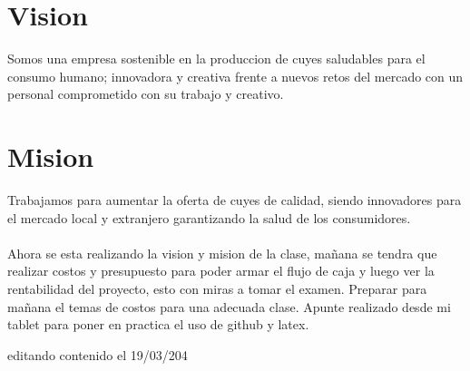 \documentclass[11pt]{article}
\begin{document}
\section{Vision}
Somos una empresa sostenible en la produccion de cuyes saludables para el consumo humano; innovadora y creativa frente a nuevos retos del mercado con un personal comprometido con su trabajo y creativo.
\section{Mision}
Trabajamos para aumentar la oferta de cuyes de calidad, siendo innovadores para el mercado local y extranjero garantizando la salud de los consumidores.\\
\\
Ahora se esta realizando la vision y mision de la clase, mañana se tendra que realizar costos y presupuesto para poder armar el flujo de caja y luego ver la rentabilidad del proyecto, esto con miras a tomar el examen. Preparar para mañana el temas de costos para una adecuada clase. Apunte realizado desde mi tablet para poner en practica el uso de github y latex.

editando contenido el 19/03/204
\end{document}
